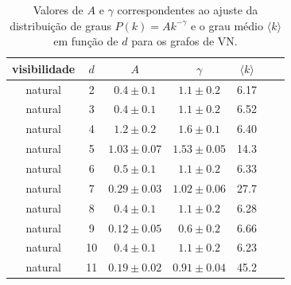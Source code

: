 \documentclass[12pt,a4paper,fleqn]{report}
\begin{document}
\begin{table}[h!]
\begin{center}
\caption{Valores de $A$ e $\gamma$ correspondentes ao ajuste da distribuição de graus
$P(k)=A k^{-\gamma}$ e o grau médio $\langle k \rangle $ em função de $d$
para os grafos de VN.} \vskip 1cm
\begin{tabular}{|c|c|c|c|c|c|c|}\hline
        visibilidade & $d$ & $A$ & $\gamma$  & $\langle k \rangle $ \\
        \hline
        natural & 2 & $0.4 \pm 0.1$  & $1.1 \pm 0.2$ & 6.17 \\
        natural & 3 & $0.4 \pm 0.1$  & $1.1 \pm 0.2$ & 6.52 \\
        natural & 4 & $1.2 \pm 0.2$  & $1.6 \pm 0.1$ & 6.40 \\
        natural & 5 & $1.03 \pm 0.07$ & $1.53 \pm 0.05$ & 14.3 \\
        natural & 6 & $0.5 \pm 0.1$ & $1.1 \pm 0.2$ & 6.33 \\
natural & 7 & $0.29 \pm 0.03$ & $1.02 \pm 0.06$ & 27.7 \\
natural & 8 & $0.4 \pm 0.1$ & $1.1 \pm 0.2$ & 6.28 \\
natural & 9 & $0.12 \pm 0.05$ & $0.6 \pm 0.2$ & 6.66 \\
natural & 10 & $0.4 \pm 0.1$ & $1.1 \pm 0.2$ & 6.23 \\
natural & 11 & $0.19 \pm 0.02$ & $0.91 \pm 0.04$ & 45.2 \\
        \hline
    \end{tabular}
    \label{tab:natural-stats}
\end{center}
\end{table}
\end{document}
